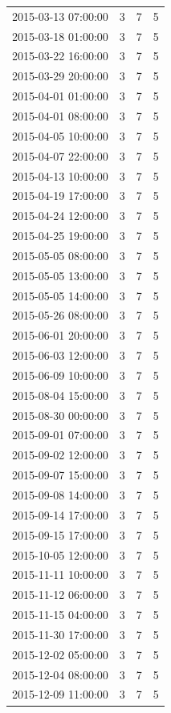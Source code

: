 \begin{tabular}{lrrr}
2015-03-13 07:00:00 & 3 & 7 & 5 \\
2015-03-18 01:00:00 & 3 & 7 & 5 \\
2015-03-22 16:00:00 & 3 & 7 & 5 \\
2015-03-29 20:00:00 & 3 & 7 & 5 \\
2015-04-01 01:00:00 & 3 & 7 & 5 \\
2015-04-01 08:00:00 & 3 & 7 & 5 \\
2015-04-05 10:00:00 & 3 & 7 & 5 \\
2015-04-07 22:00:00 & 3 & 7 & 5 \\
2015-04-13 10:00:00 & 3 & 7 & 5 \\
2015-04-19 17:00:00 & 3 & 7 & 5 \\
2015-04-24 12:00:00 & 3 & 7 & 5 \\
2015-04-25 19:00:00 & 3 & 7 & 5 \\
2015-05-05 08:00:00 & 3 & 7 & 5 \\
2015-05-05 13:00:00 & 3 & 7 & 5 \\
2015-05-05 14:00:00 & 3 & 7 & 5 \\
2015-05-26 08:00:00 & 3 & 7 & 5 \\
2015-06-01 20:00:00 & 3 & 7 & 5 \\
2015-06-03 12:00:00 & 3 & 7 & 5 \\
2015-06-09 10:00:00 & 3 & 7 & 5 \\
2015-08-04 15:00:00 & 3 & 7 & 5 \\
2015-08-30 00:00:00 & 3 & 7 & 5 \\
2015-09-01 07:00:00 & 3 & 7 & 5 \\
2015-09-02 12:00:00 & 3 & 7 & 5 \\
2015-09-07 15:00:00 & 3 & 7 & 5 \\
2015-09-08 14:00:00 & 3 & 7 & 5 \\
2015-09-14 17:00:00 & 3 & 7 & 5 \\
2015-09-15 17:00:00 & 3 & 7 & 5 \\
2015-10-05 12:00:00 & 3 & 7 & 5 \\
2015-11-11 10:00:00 & 3 & 7 & 5 \\
2015-11-12 06:00:00 & 3 & 7 & 5 \\
2015-11-15 04:00:00 & 3 & 7 & 5 \\
2015-11-30 17:00:00 & 3 & 7 & 5 \\
2015-12-02 05:00:00 & 3 & 7 & 5 \\
2015-12-04 08:00:00 & 3 & 7 & 5 \\
2015-12-09 11:00:00 & 3 & 7 & 5 \\

\end{tabular}
